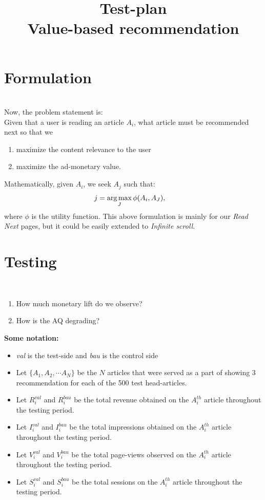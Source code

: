 \documentclass[11]{article}
\title{Test-plan \\ \large{Value-based  recommendation}}
\date{}
\begin{document}
\maketitle


\section{Formulation}

\vspace{0.3cm}

\\
Now, the problem statement is: \\
Given that a user is reading an article $A_i$, what article must be recommended next so that we
\begin{enumerate}
\item maximize the content relevance to the user
\item maximize the ad-monetary value.
\end{enumerate} 

Mathematically, given $A_i$, we seek $A_j$ such that:
\begin{align*}
 j&= \operatorname*{arg\,max}_J   \phi(A_i, A_{J}) ,
\end{align*}
where $\phi$ is the utility function. This above formulation is mainly for our \textit{Read Next} pages, but it could be easily extended to \textit{Infinite scroll}.

\section{Testing}

\\
\begin{enumerate}
\item How much monetary lift do we observe? 
\item How is the AQ degrading?
\end{enumerate}



\textbf{Some notation:}
\begin{itemize}
\item \textit{val} is the test-side and \textit{bau} is the control side
\item Let $\{ A_1, A_2, \cdots A_N \}$ be the $N$ articles that were served as a part of showing 3 recommendation for each of the 500 test head-articles.
\item Let $R_i^{val}$ and $R_i^{bau}$ be the total revenue obtained on the $A_i^{th}$ article throughout the testing period.
\item Let $I_i^{val}$ and $I_i^{bau}$ be the total impressions obtained on the $A_i^{th}$ article throughout the testing period.
\item Let $V_i^{val}$ and $V_i^{bau}$ be the total page-views observed on the $A_i^{th}$ article throughout the testing period.
\item Let $S_i^{val}$ and $S_i^{bau}$ be the total sessions on the $A_i^{th}$ article throughout the testing period.
\end{itemize}
\end{document}
